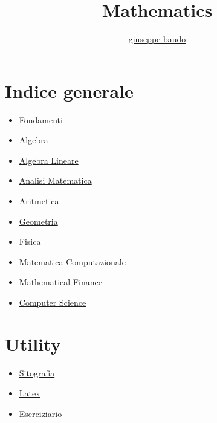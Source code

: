 \documentclass[a4paper,10pt]{article}
\title{Mathematics}
\author{\href{http://www.baudo.hol.es}{giuseppe baudo}}
\begin{document}
\maketitle

\section{Indice generale}
\begin{itemize}
  \item \href{Fondamenti.html}{Fondamenti}
  \item \href{Algebra.html}{Algebra}
  \item \href{AlgebraLineare.html}{Algebra Lineare}
  \item \href{Analisi.html}{Analisi Matematica}
  \item \href{Aritmetica.html}{Aritmetica}  
  \item \href{Geometria.html}{Geometria}
  \item Fisica  
  \item \href{MatematicaComputazionale.html}{Matematica Computazionale}
  \item \href{Finance.html}{Mathematical Finance}  
  \item \href{Programming.html}{Computer Science}  
\end{itemize}

\section{Utility}
\begin{itemize}
  
  \item \href{Sitografia.html}{Sitografia}  
  \item \href{latex.html}{Latex} 
  \item \href{Eserciziario.html}{Eserciziario}  
\end{itemize}
\end{document}
